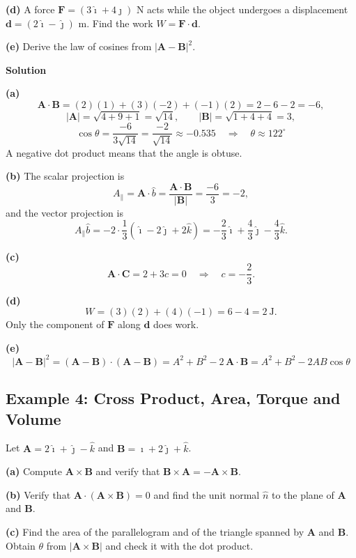 \documentclass[../main.tex]{subfiles}
\begin{document}
\textbf{(d)} A force $\mathbf{F} = (3\hat{\imath}+4\hat{\jmath})$ N acts while the object undergoes a displacement $\mathbf{d} = (2\hat{\imath}-\hat{\jmath})$ m. Find the work $W = \mathbf{F}\cdot\mathbf{d}$.

\textbf{(e)} Derive the law of cosines from $|\mathbf{A}-\mathbf{B}|^2$.

\bigskip
\textbf{Solution}

\textbf{(a)}
\[
\mathbf{A}\cdot\mathbf{B} = (2)(1)+(3)(-2)+(-1)(2) = 2-6-2 = -6,
\]
\[
|\mathbf{A}| = \sqrt{4+9+1} = \sqrt{14},
\qquad
|\mathbf{B}| = \sqrt{1+4+4} = 3,
\]
\[
\cos\theta = \frac{-6}{3\sqrt{14}} = \frac{-2}{\sqrt{14}} \approx -0.535
\quad \Longrightarrow \quad \theta \approx 122^\circ 
\]
A negative dot product means that the angle is obtuse.

\textbf{(b)} The scalar projection is
\[
A_{\parallel} = \mathbf{A}\cdot\hat{b} = \frac{\mathbf{A}\cdot\mathbf{B}}{|\mathbf{B}|} = \frac{-6}{3} = -2,
\]
and the vector projection is
\[
A_{\parallel}\hat{b} = -2\cdot\frac{1}{3}\left(\hat{\imath}-2\hat{\jmath}+2\hat{k}\right)
= -\frac{2}{3}\hat{\imath}+\frac{4}{3}\hat{\jmath}-\frac{4}{3}\hat{k}.
\]

\textbf{(c)}
\[
\mathbf{A}\cdot\mathbf{C} = 2 + 3c = 0
\quad \Longrightarrow \quad c = -\frac{2}{3}.
\]

\textbf{(d)}
\[
W = (3)(2)+(4)(-1) = 6-4 = 2\ \text{J}.
\]
Only the component of $\mathbf{F}$ along $\mathbf{d}$ does work.

\textbf{(e)}
\[
|\mathbf{A}-\mathbf{B}|^2 = (\mathbf{A}-\mathbf{B})\cdot(\mathbf{A}-\mathbf{B})
= A^2 + B^2 - 2\,\mathbf{A}\cdot\mathbf{B}
= A^2 + B^2 - 2AB\cos\theta 
\]


\subsection{Example 4: Cross Product, Area, Torque and Volume}

Let $\mathbf{A} = 2\hat{\imath}+\hat{\jmath}-\hat{k}$ and $\mathbf{B} = \hat{\imath}+2\hat{\jmath}+\hat{k}$.

\textbf{(a)} Compute $\mathbf{A}\times\mathbf{B}$ and verify that $\mathbf{B}\times\mathbf{A} = -\mathbf{A}\times\mathbf{B}$.

\textbf{(b)} Verify that $\mathbf{A}\cdot(\mathbf{A}\times\mathbf{B}) = 0$ and find the unit normal $\hat{n}$ to the plane of $\mathbf{A}$ and $\mathbf{B}$.

\textbf{(c)} Find the area of the parallelogram and of the triangle spanned by $\mathbf{A}$ and $\mathbf{B}$. Obtain $\theta$ from $|\mathbf{A}\times\mathbf{B}|$ and check it with the dot product.
\end{document}
